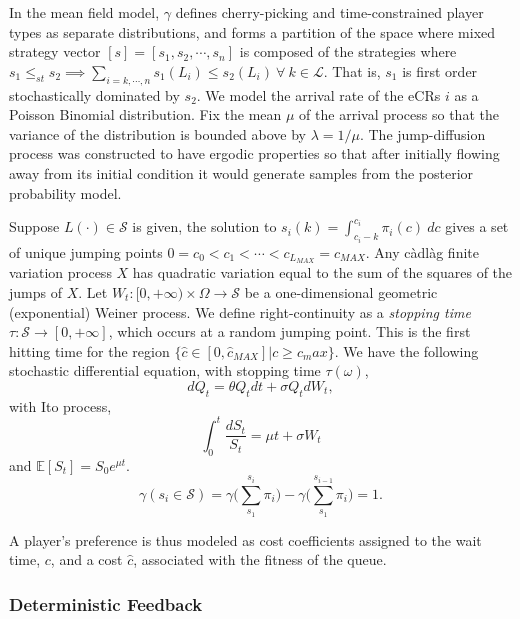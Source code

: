 \documentclass[10pt]{article}
\newcommand{\mcL}{\mathcal{L}}
\newcommand{\mcS}{\mathcal{S}}
\theoremstyle{definition}
\begin{document}
In the mean field model, $\gamma$ defines cherry-picking and
time-constrained player types as separate distributions, and forms a partition
of the space where mixed strategy vector $[s]= [s_1, s_2, \cdots, s_n]$ is composed of
the strategies where $s_1 \le_{st} s_2 \implies \sum_{i = k, \cdots, n} s_1(L_i)
\le s_2(L_i) \ \forall \ k \in \mcL$. That is, $s_1$ is first order
stochastically dominated by $s_2$. We model the arrival rate of the eCRs $i$ as a 
Poisson Binomial distribution. Fix the mean $\mu$ of the arrival process so that
the variance of the distribution is bounded above by $\lambda = 1/\mu$.
The jump-diffusion process was constructed to have ergodic properties so that after initially flowing away from its initial condition it would generate samples from the posterior probability model.


Suppose $L(\cdot)\in \mcS$ is given, the solution to
$s_i(k) = \int_{c_i - k}^{c_i} \pi_i(c) \ dc$ gives a set of unique jumping points $0=c_0<
c_1< \cdots < c_{L_{MAX}} = c_{MAX}$. 
Any càdlàg finite variation process $X$ has quadratic variation equal to the sum
of the squares of the jumps of $X$.
Let $W_t: [0, +\infty) \times \Omega \rightarrow \mcS$ be a
one-dimensional geometric (exponential) Weiner process. We define right-continuity as 
a \emph{stopping time} $\tau:\mcS \rightarrow [0,+\infty]$, which occurs at a random jumping point. This is the first hitting time
for the region $\lbrace \hat c \in [0,\hat c_{MAX}] \vert c \ge c_max\rbrace$.
We have the following stochastic differential equation, with stopping time
$\tau(\omega)$,
$$
    dQ_t = \theta Q_t dt + \sigma Q_t dW_t,
$$
with Ito process,
$$
    \displaystyle\int_0^t \frac{dS_t}{S_t} = \mu t + \sigma W_t
$$
and $\mathbb{E}[S_t] = S_0e^{\mu t}$.
$$
    \gamma(s_i \in \mcS) = \gamma\bigg(\displaystyle\sum_{s_1}^{s_i} \pi_i \bigg)-
    \gamma\bigg(\displaystyle\sum_{s_1}^{s_{i-1}}\pi_i\bigg) = 1.
$$

A player's preference is thus modeled as cost coefficients assigned to the wait
time, $c$, and a cost $\hat c$, associated with the fitness of the queue.

\subsubsection{Deterministic Feedback}
\end{document}
